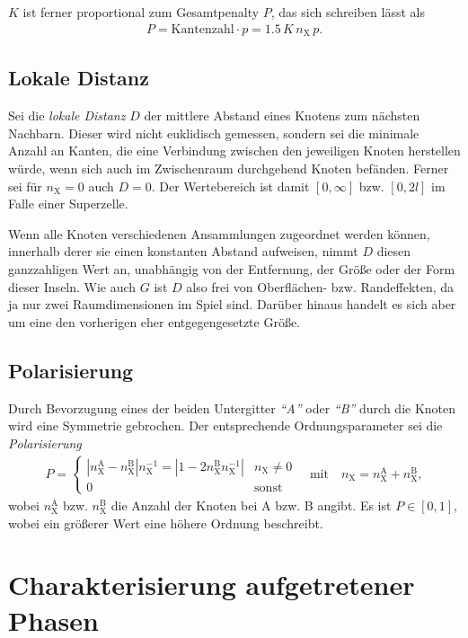\documentclass[a4paper, 10pt, twoside, openany]{book} %
\newcommand \abs[1]{\left | #1 \right |}
\def \nX {n_\mathrm{X}}
\begin{document}
$K$ ist ferner proportional zum Gesamtpenalty $P$, das sich schreiben lässt als
%
\begin{align*}
    P = \text{Kantenzahl} \cdot p = 1.5 \, K \, \nX \, p.
\end{align*}

\subsection{Lokale Distanz}

Sei die \emph{lokale Distanz} $D$ der mittlere Abstand eines Knotens zum nächsten Nachbarn. Dieser wird nicht euklidisch gemessen, sondern sei die minimale Anzahl an Kanten, die eine Verbindung zwischen den jeweiligen Knoten herstellen würde, wenn sich auch im Zwischenraum durchgehend Knoten befänden. Ferner sei für $\nX = 0$ auch $D = 0$. Der Wertebereich ist damit $[0, \infty]$ bzw. $[0, 2 l]$ im Falle einer Superzelle.

Wenn alle Knoten verschiedenen Ansammlungen zugeordnet werden können, innerhalb derer sie einen konstanten Abstand aufweisen, nimmt $D$ diesen ganzzahligen Wert an, unabhängig von der Entfernung, der Größe oder der Form dieser Inseln. Wie auch $G$ ist $D$ also frei von Oberflächen- bzw. Randeffekten, da ja nur zwei Raumdimensionen im Spiel sind. Darüber hinaus handelt es sich aber um eine den vorherigen eher entgegengesetzte Größe.

\subsection{Polarisierung}

Durch Bevorzugung eines der beiden Untergitter \emph{"`A"'} oder \emph{"`B"'} durch die Knoten wird eine Symmetrie gebrochen. Der entsprechende Ordnungsparameter sei die \emph{Polarisierung}
%
\begin{align*}
    P = \begin{cases} \abs{\nX^\text{A} - \nX^\text{B}} \nX^{-1} = \abs{1 - 2 \nX^\text{B} \nX^{-1}} & \nX \neq 0 \\ 0 & \text{sonst} \end{cases} \quad \text{mit} \quad \nX = \nX^\text{A} + \nX^\text{B},
\end{align*}
%
wobei $\nX^\text{A}$ bzw. $\nX^\text{B}$ die Anzahl der Knoten bei A bzw. B angibt. Es ist $P \in [0, 1]$, wobei ein größerer Wert eine höhere Ordnung beschreibt.

\section{Charakterisierung aufgetretener Phasen}
\label{Charakterisierung aufgetretener Phasen}
\end{document}
